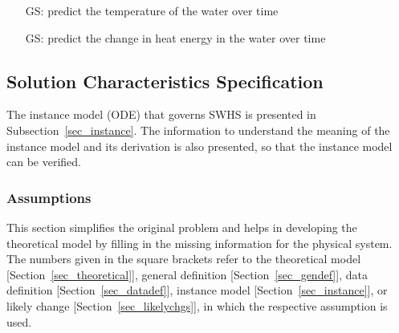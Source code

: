 \documentclass[12pt]{article}
\newcounter{goalnum} %
\newcommand{\progname}{SWHS}
\begin{document}
\begin{itemize}

\item[GS\refstepcounter{goalnum}\thegoalnum \label{G_wtemp}:] predict the temperature of the water 
 over time

	
\item[GS\refstepcounter{goalnum}\thegoalnum \label{G_wenergy}:] predict the 
change in heat energy in the water over time


\end{itemize}

\subsection{Solution Characteristics Specification}

The instance model (ODE) that governs \progname{} is presented in
Subsection~\ref{sec_instance}.  The information to understand the meaning of the
instance model and its derivation is also presented, so that the instance
model can be verified.

\subsubsection{Assumptions}

This section simplifies the original problem and helps in developing the
theoretical model by filling in the missing information for the physical
system. The numbers given in the square brackets refer to the theoretical model
{[}Section~\ref{sec_theoretical}{]}, general definition {[}Section~\ref{sec_gendef}{]}, data definition {[}Section~\ref{sec_datadef}{]}, instance model {[}Section~\ref{sec_instance}{]}, or
likely change {[}Section~\ref{sec_likelychgs}{]}, in which the respective assumption is used.
\end{document}
